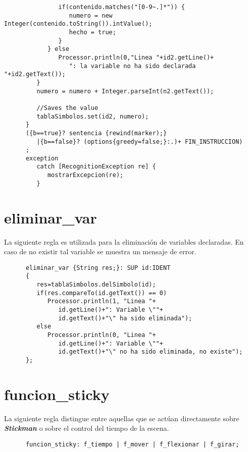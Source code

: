 \begin{lstlisting}
               if(contenido.matches("[0-9~.]*")) {
                  numero = new Integer(contenido.toString()).intValue();
                  hecho = true;
               } 
            } else 
               Processor.println(0,"Linea "+id2.getLine()+
                  ": la variable no ha sido declarada "+id2.getText());
         }   
         numero = numero + Integer.parseInt(n2.getText());
            
         //Saves the value
         tablaSimbolos.set(id2, numero);
      } 
      ({b==true}? sentencia {rewind(marker);}
         |{b==false}? (options{greedy=false;}:.)+ FIN_INSTRUCCION) 
      ;
      exception
         catch [RecognitionException re] {
            mostrarExcepcion(re);
         }
   \end{lstlisting}

   \section{eliminar\_var}
   La siguiente regla es utilizada para la eliminación de variables declaradas. En caso de no existir tal variable se muestra
   un mensaje de error.
   \begin{lstlisting}
      eliminar_var {String res;}: SUP id:IDENT
      {
         res=tablaSimbolos.delSimbolo(id);
         if(res.compareTo(id.getText()) == 0)
            Processor.println(1, "Linea "+
               id.getLine()+": Variable \""+
               id.getText()+"\" ha sido eliminada");
         else 
            Processor.println(0, "Linea "+
               id.getLine()+": Variable \""+
               id.getText()+"\" no ha sido eliminada, no existe");
      };
   \end{lstlisting}

   \section{funcion\_sticky}
   La siguiente regla distingue entre aquellas que se actúan directamente sobre \textbf{\textit{Stickman}} o sobre el control del tiempo
   de la escena.
   \begin{lstlisting}
      funcion_sticky: f_tiempo | f_mover | f_flexionar | f_girar;
   \end{lstlisting}

